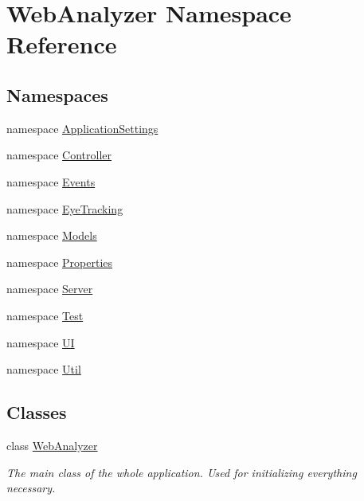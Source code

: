 \hypertarget{namespace_web_analyzer}{}\section{Web\+Analyzer Namespace Reference}
\label{namespace_web_analyzer}
\subsection*{Namespaces}
\begin{DoxyCompactItemize}
\item 
namespace \hyperlink{namespace_web_analyzer_1_1_application_settings}{Application\+Settings}
\item 
namespace \hyperlink{namespace_web_analyzer_1_1_controller}{Controller}
\item 
namespace \hyperlink{namespace_web_analyzer_1_1_events}{Events}
\item 
namespace \hyperlink{namespace_web_analyzer_1_1_eye_tracking}{Eye\+Tracking}
\item 
namespace \hyperlink{namespace_web_analyzer_1_1_models}{Models}
\item 
namespace \hyperlink{namespace_web_analyzer_1_1_properties}{Properties}
\item 
namespace \hyperlink{namespace_web_analyzer_1_1_server}{Server}
\item 
namespace \hyperlink{namespace_web_analyzer_1_1_test}{Test}
\item 
namespace \hyperlink{namespace_web_analyzer_1_1_u_i}{U\+I}
\item 
namespace \hyperlink{namespace_web_analyzer_1_1_util}{Util}
\end{DoxyCompactItemize}
\subsection*{Classes}
\begin{DoxyCompactItemize}
\item 
class \hyperlink{class_web_analyzer_1_1_web_analyzer}{Web\+Analyzer}
\begin{DoxyCompactList}\small\item\em The main class of the whole application. Used for initializing everything necessary. \end{DoxyCompactList}\end{DoxyCompactItemize}
